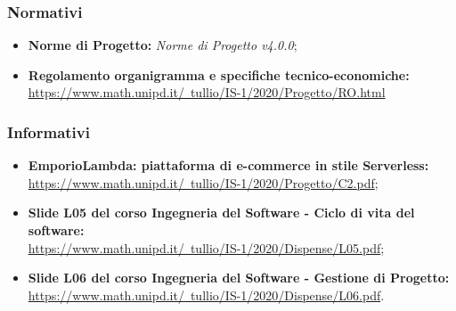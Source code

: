 \subsubsection{Normativi}
\begin{itemize}
    \item \textbf{Norme di Progetto: } \emph{Norme di Progetto v4.0.0};
    \item \textbf{Regolamento organigramma e specifiche tecnico-economiche: } \\ \href{https://www.math.unipd.it/~tullio/IS-1/2020/Progetto/RO.html}{https://www.math.unipd.it/~tullio/IS-1/2020/Progetto/RO.html}
\end{itemize}
\subsubsection{Informativi}
\begin{itemize}
    \item \textbf{EmporioLambda: piattaforma di e-commerce in stile Serverless: } \\ \href{https://www.math.unipd.it/~tullio/IS-1/2020/Progetto/C2.pdf}{https://www.math.unipd.it/~tullio/IS-1/2020/Progetto/C2.pdf};
    \item \textbf{Slide L05 del corso Ingegneria del Software - Ciclo di vita del software: } \\ \href{https://www.math.unipd.it/~tullio/IS-1/2020/Dispense/L05.pdf}{https://www.math.unipd.it/~tullio/IS-1/2020/Dispense/L05.pdf};
    \item \textbf{Slide L06 del corso Ingegneria del Software - Gestione di Progetto: } \\ \href{https://www.math.unipd.it/~tullio/IS-1/2020/Dispense/L06.pdf}{https://www.math.unipd.it/~tullio/IS-1/2020/Dispense/L06.pdf}.
\end{itemize}
